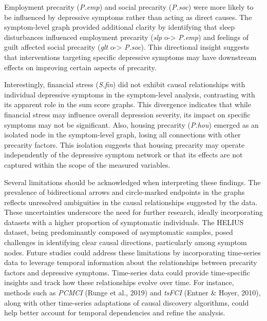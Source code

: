 \documentclass[
]{article}
\begin{document}
Employment precarity (\emph{P.emp}) and social precarity (\emph{P.soc})
were more likely to be influenced by depressive symptoms rather than
acting as direct causes. The symptom-level graph provided additional
clarity by identifying that sleep disturbances influenced employment
precarity (\emph{slp} o-\textgreater{} \emph{P.emp}) and feelings of
guilt affected social precarity (\emph{glt} o-\textgreater{}
\emph{P.soc}). This directional insight suggests that interventions
targeting specific depressive symptoms may have downstream effects on
improving certain aspects of precarity.

Interestingly, financial stress (\emph{S.fin}) did not exhibit causal
relationships with individual depressive symptoms in the symptom-level
analysis, contrasting with its apparent role in the sum score graphs.
This divergence indicates that while financial stress may influence
overall depression severity, its impact on specific symptoms may not be
significant. Also, housing precarity (\emph{P.hou}) emerged as an
isolated node in the symptom-level graph, losing all connections with
other precarity factors. This isolation suggests that housing precarity
may operate independently of the depressive symptom network or that its
effects are not captured within the scope of the measured variables.

Several limitations should be acknowledged when interpreting these
findings. The prevalence of bidirectional arrows and circle-marked
endpoints in the graphs reflects unresolved ambiguities in the causal
relationships suggested by the data. These uncertainties underscore the
need for further research, ideally incorporating datasets with a higher
proportion of symptomatic individuals. The HELIUS dataset, being
predominantly composed of asymptomatic samples, posed challenges in
identifying clear causal directions, particularly among symptom nodes.
Future studies could address these limitations by incorporating
time-series data to leverage temporal information about the
relationships between precarity factors and depressive symptoms.
Time-series data could provide time-specific insights and track how
these relationships evolve over time. For instance, methods such as
\emph{PCMCI} (Runge et al., 2019) and \emph{tsFCI} (Entner \& Hoyer,
2010), along with other time-series adaptations of causal discovery
algorithms, could help better account for temporal dependencies and
refine the analysis.
\end{document}
